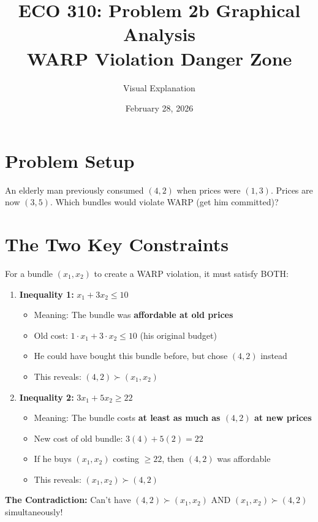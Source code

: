 \documentclass[11pt]{article}
\title{ECO 310: Problem 2b Graphical Analysis\\WARP Violation Danger Zone}
\author{Visual Explanation}
\date{February 28, 2026}
\begin{document}
\maketitle

\section{Problem Setup}

\begin{tcolorbox}[colback=blue!5!white,colframe=blue!75!black,title=Problem 2b]
An elderly man previously consumed $(4,2)$ when prices were $(1,3)$. Prices are now $(3,5)$. Which bundles would violate WARP (get him committed)?
\end{tcolorbox}

\section{The Two Key Constraints}

For a bundle $(x_1, x_2)$ to create a WARP violation, it must satisfy BOTH:

\begin{enumerate}
\item \textbf{Inequality 1:} $x_1 + 3x_2 \leq 10$
\begin{itemize}
\item Meaning: The bundle was \textbf{affordable at old prices}
\item Old cost: $1 \cdot x_1 + 3 \cdot x_2 \leq 10$ (his original budget)
\item He could have bought this bundle before, but chose $(4,2)$ instead
\item This reveals: $(4,2) \succ (x_1, x_2)$
\end{itemize}

\item \textbf{Inequality 2:} $3x_1 + 5x_2 \geq 22$
\begin{itemize}
\item Meaning: The bundle costs \textbf{at least as much as $(4,2)$ at new prices}
\item New cost of old bundle: $3(4) + 5(2) = 22$
\item If he buys $(x_1, x_2)$ costing $\geq 22$, then $(4,2)$ was affordable
\item This reveals: $(x_1, x_2) \succ (4,2)$
\end{itemize}
\end{enumerate}

\textbf{The Contradiction:} Can't have $(4,2) \succ (x_1, x_2)$ AND $(x_1, x_2) \succ (4,2)$ simultaneously!
\end{document}
